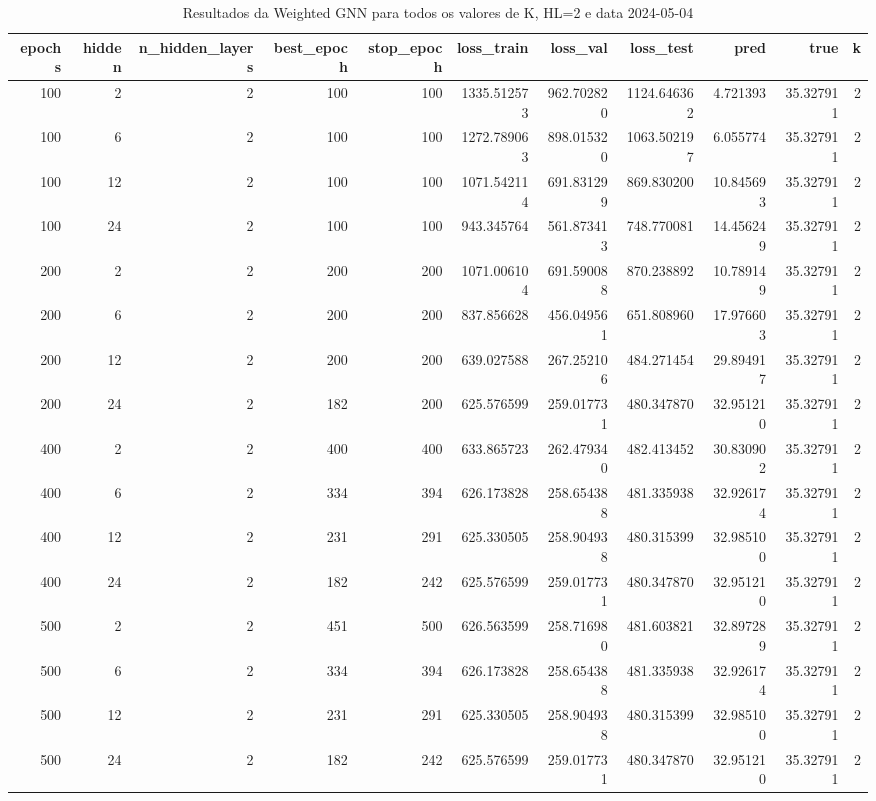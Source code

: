 \begin{table}
\caption{Resultados da Weighted GNN para todos os valores de K, HL=2 e data 2024-05-04}
\label{tab:weighted_gnn_results_allk_hl2_d20240504}
\begin{tabular}{rrrrrrrrrrr}
\toprule
epochs & hidden & n\_hidden\_layers & best\_epoch & stop\_epoch & loss\_train & loss\_val & loss\_test & pred & true & k \\
\midrule
100 & 2 & 2 & 100 & 100 & 1335.512573 & 962.702820 & 1124.646362 & 4.721393 & 35.327911 & 2 \\
100 & 6 & 2 & 100 & 100 & 1272.789063 & 898.015320 & 1063.502197 & 6.055774 & 35.327911 & 2 \\
100 & 12 & 2 & 100 & 100 & 1071.542114 & 691.831299 & 869.830200 & 10.845693 & 35.327911 & 2 \\
100 & 24 & 2 & 100 & 100 & 943.345764 & 561.873413 & 748.770081 & 14.456249 & 35.327911 & 2 \\
200 & 2 & 2 & 200 & 200 & 1071.006104 & 691.590088 & 870.238892 & 10.789149 & 35.327911 & 2 \\
200 & 6 & 2 & 200 & 200 & 837.856628 & 456.049561 & 651.808960 & 17.976603 & 35.327911 & 2 \\
200 & 12 & 2 & 200 & 200 & 639.027588 & 267.252106 & 484.271454 & 29.894917 & 35.327911 & 2 \\
200 & 24 & 2 & 182 & 200 & 625.576599 & 259.017731 & 480.347870 & 32.951210 & 35.327911 & 2 \\
400 & 2 & 2 & 400 & 400 & 633.865723 & 262.479340 & 482.413452 & 30.830902 & 35.327911 & 2 \\
400 & 6 & 2 & 334 & 394 & 626.173828 & 258.654388 & 481.335938 & 32.926174 & 35.327911 & 2 \\
400 & 12 & 2 & 231 & 291 & 625.330505 & 258.904938 & 480.315399 & 32.985100 & 35.327911 & 2 \\
400 & 24 & 2 & 182 & 242 & 625.576599 & 259.017731 & 480.347870 & 32.951210 & 35.327911 & 2 \\
500 & 2 & 2 & 451 & 500 & 626.563599 & 258.716980 & 481.603821 & 32.897289 & 35.327911 & 2 \\
500 & 6 & 2 & 334 & 394 & 626.173828 & 258.654388 & 481.335938 & 32.926174 & 35.327911 & 2 \\
500 & 12 & 2 & 231 & 291 & 625.330505 & 258.904938 & 480.315399 & 32.985100 & 35.327911 & 2 \\
500 & 24 & 2 & 182 & 242 & 625.576599 & 259.017731 & 480.347870 & 32.951210 & 35.327911 & 2 \\

\end{tabular}
\end{table}
